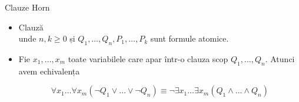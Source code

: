 \documentclass[xcolor=pdftex,romanian,colorlinks]{beamer}
\begin{document}
\begin{frame}{Clauze Horn}


\begin{center}
\end{center}


\begin{itemize}

\item Clauză  \\
unde $n,k\geq 0$ și  $Q_1,\ldots, Q_n,P_1,\ldots, P_k$ sunt formule atomice.


\bigskip
\item Fie $x_1, \ldots, x_m$ toate variabilele care apar într-o clauza scop 
$Q_1,\ldots, Q_n$. Atunci avem echivalența

\vspace{-.6cm}
$$
\forall x_1\ldots \forall x_m (\neg Q_1\vee\ldots \vee \neg Q_n) 
\equiv \neg \exists x_1\ldots \exists x_m (Q_1\wedge \ldots \wedge  Q_n)
$$

\end{itemize}

\begin{center}



\end{center}
\end{frame}
\end{document}
